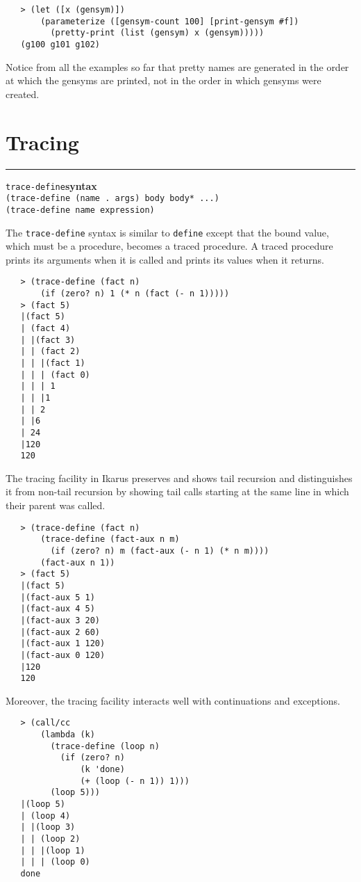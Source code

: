 \documentclass[onecolumn, 12pt, twoside, openright, dvipdfm]{book}
\makeatletter
\newcommand{\idxlabeldefun}[5]{
\vspace{1ex}
\rule{\textwidth}{2pt}
{\phantomsection\index{#1@\texttt{#2}}\label{#3}{\Large\texttt{#4}}\hfill\textbf{#5}}\\}
\newcommand{\idxdefun}[3]{\idxlabeldefun{#1}{#2}{#1}{#2}{#3}}
\newcommand{\defun}[2]{\idxdefun{#1}{#1}{#2}}
\makeatother
\begin{document}
\begin{verbatim}
   > (let ([x (gensym)])
       (parameterize ([gensym-count 100] [print-gensym #f])
         (pretty-print (list (gensym) x (gensym)))))
   (g100 g101 g102)
\end{verbatim}

Notice from all the examples so far that pretty names are generated
in the order at which the gensyms are printed, not in the order in
which gensyms were created.

\newpage
\section{Tracing}

\defun{trace-define}{syntax}
\texttt{(trace-define (name . args) body body* ...)}\\
\texttt{(trace-define name expression)}

The \texttt{trace-define} syntax is similar to \texttt{define}
except that the bound value, which must be a procedure, becomes a
traced procedure.  A traced procedure prints its arguments when it
is called and prints its values when it returns.  

\begin{verbatim}
   > (trace-define (fact n)
       (if (zero? n) 1 (* n (fact (- n 1)))))
   > (fact 5)
   |(fact 5)
   | (fact 4)
   | |(fact 3)
   | | (fact 2)
   | | |(fact 1)
   | | | (fact 0)
   | | | 1
   | | |1
   | | 2
   | |6
   | 24
   |120
   120
\end{verbatim}

The tracing facility in Ikarus preserves and shows tail recursion
and distinguishes it from non-tail recursion by showing tail calls
starting at the same line in which their parent was called.  

\begin{verbatim}
   > (trace-define (fact n)
       (trace-define (fact-aux n m)
         (if (zero? n) m (fact-aux (- n 1) (* n m))))
       (fact-aux n 1))
   > (fact 5)
   |(fact 5)
   |(fact-aux 5 1)
   |(fact-aux 4 5)
   |(fact-aux 3 20)
   |(fact-aux 2 60)
   |(fact-aux 1 120)
   |(fact-aux 0 120)
   |120
   120
\end{verbatim}

Moreover, the tracing facility interacts well with continuations and
exceptions.

\begin{verbatim}
   > (call/cc
       (lambda (k) 
         (trace-define (loop n)
           (if (zero? n) 
               (k 'done)
               (+ (loop (- n 1)) 1)))
         (loop 5)))
   |(loop 5)
   | (loop 4)
   | |(loop 3)
   | | (loop 2)
   | | |(loop 1)
   | | | (loop 0)
   done
\end{verbatim}
\end{document}
